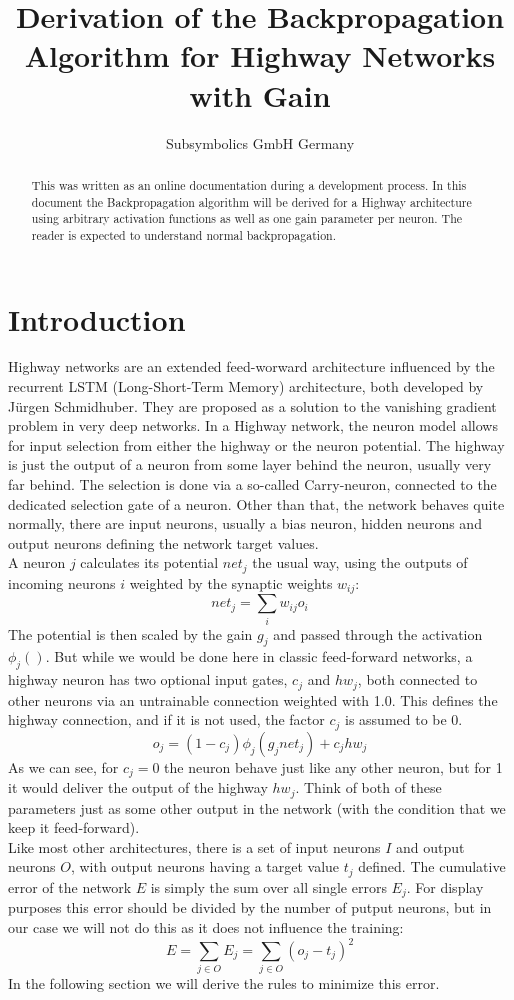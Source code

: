 \documentclass[a4paper,11pt]{article}
\begin{document}
\title{Derivation of the Backpropagation Algorithm for Highway Networks with Gain}
\author{Subsymbolics GmbH Germany}
\maketitle
\begin{abstract}
This was written as an online documentation during a development process.
In this document the Backpropagation algorithm will be derived for a Highway architecture
using arbitrary activation functions as well as one gain parameter per neuron. The reader is expected to understand normal backpropagation. 
\end{abstract}

\section{Introduction}
Highway networks are an extended feed-worward architecture influenced by the recurrent LSTM (Long-Short-Term Memory) architecture, both developed by J\"urgen Schmidhuber. They are proposed as a solution to the vanishing gradient problem in very deep networks. 
In a Highway network, the neuron model allows for input selection from either the highway or the neuron potential. The highway is just the output of a neuron from some layer behind the neuron, usually very far behind. The selection is done via a so-called Carry-neuron, connected to the dedicated selection gate of a neuron. Other than that, the network behaves quite normally, there are input neurons, usually a bias neuron, hidden neurons and output neurons defining the network target values.\\
A neuron $j$ calculates its potential $net_j$ the usual way, using the outputs of incoming neurons $i$ weighted by the synaptic weights $w_{ij}$:
\[
net_j=\sum_i w_{ij}o_i
\]
The potential is then scaled by the gain $g_j$ and passed through the activation $\phi_j()$. But while we would be done here in classic feed-forward networks, a highway neuron has two optional input gates, $c_j$ and $hw_j$, both connected to other neurons via an untrainable connection weighted with 1.0. This defines the highway connection, and if it is not used, the factor $c_j$ is assumed to be 0.
\[ o_j = (1-c_j)\phi_j(g_j net_j) + c_j hw_j\]
\newpage
As we can see, for $c_j=0$ the neuron behave just like any other neuron, but for 1 it would deliver the output of the highway $hw_j$. Think of both of these parameters just as some other output in the network (with the condition that we keep it feed-forward).\\
Like most other architectures, there is a set of input neurons $I$ and output neurons $O$, with output neurons having a target value $t_j$ defined. The cumulative error of the network $E$ is simply the sum over all single errors $E_j$. For display purposes this error should be divided by the number of putput neurons, but in our case we will not do this as it does not influence the training:
\[ E=\sum_{j\in O} E_j = \sum_{j\in O} (o_j-t_j)^2 \]
In the following section we will derive the rules to minimize this error.
\end{document}

